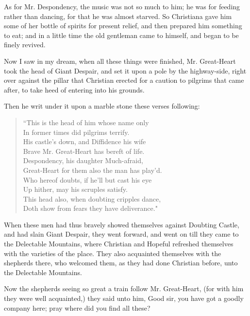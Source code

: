 As for Mr. Despondency, the music was not so much to him; he was for feeding rather than dancing, for that he was almost starved. So Christiana gave him some of her bottle of spirits for present relief, and then prepared him something to eat; and in a little time the old gentleman came to himself, and began to be finely revived.

Now I saw in my dream, when all these things were finished, Mr. Great-Heart took the head of Giant Despair, and set it upon a pole by the highway-side, right over against the pillar that Christian erected for a caution to pilgrims that came after, to take heed of entering into his grounds.

 Then he writ under it upon a marble stone these verses following:
\begin{verse}
``This is the head of him whose name only\\
In former times did pilgrims terrify.\\
His castle's down, and Diffidence his wife\\
Brave Mr. Great-Heart has bereft of life.\\
Despondency, his daughter Much-afraid,\\
Great-Heart for them also the man has play'd.\\
Who hereof doubts, if he'll but cast his eye\\
Up hither, may his scruples satisfy.\\
This head also, when doubting cripples dance,\\
Doth show from fears they have deliverance."\\
\end{verse}

When these men had thus bravely showed themselves against Doubting Castle, and had slain Giant Despair, they went forward, and went on till they came to the Delectable Mountains, where Christian and Hopeful refreshed themselves with the varieties of the place. They also acquainted themselves with the shepherds there, who welcomed them, as they had done Christian before, unto the Delectable Mountains.

Now the shepherds seeing so great a train follow Mr. Great-Heart, (for with him they were well acquainted,) they said unto him, Good sir, you have got a goodly company here; pray where did you find all these?

